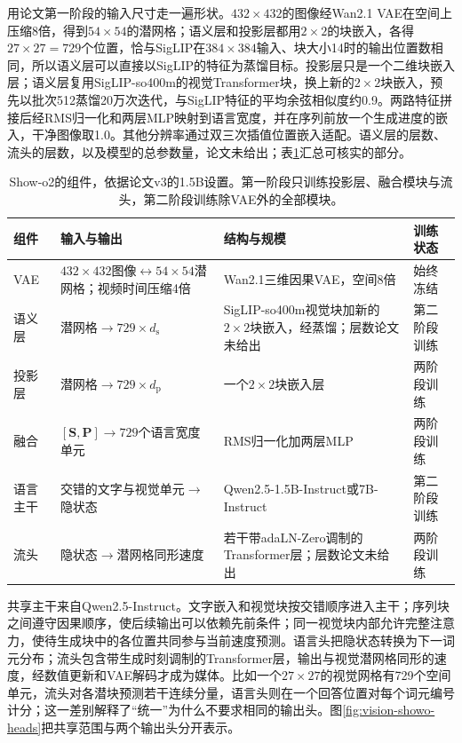 用论文第一阶段的输入尺寸走一遍形状。$432\times432$的图像经Wan2.1 VAE在空间上压缩8倍，得到$54\times54$的潜网格；语义层和投影层都用$2\times2$的块嵌入，各得$27\times27=729$个位置，恰与SigLIP在$384\times384$输入、块大小14时的输出位置数相同，所以语义层可以直接以SigLIP的特征为蒸馏目标。投影层只是一个二维块嵌入层；语义层复用SigLIP-so400m的视觉Transformer块，换上新的$2\times2$块嵌入，预先以批次512蒸馏20万次迭代，与SigLIP特征的平均余弦相似度约0.9。两路特征拼接后经RMS归一化和两层MLP映射到语言宽度，并在序列前放一个生成进度的嵌入，干净图像取1.0。其他分辨率通过双三次插值位置嵌入适配。语义层的层数、流头的层数，以及模型的总参数量，论文未给出；表\ref{tab:vision-models-showo2-config}汇总可核实的部分。

\begin{table}[htbp]
  \centering
  \small
  \begin{tabularx}{\linewidth}{@{}p{14mm}XXp{14mm}@{}}
    \toprule
    组件 & 输入与输出 & 结构与规模 & 训练状态\\
    \midrule
    VAE & $432\times432$图像$\leftrightarrow54\times54$潜网格；视频时间压缩4倍 & Wan2.1三维因果VAE，空间8倍 & 始终冻结\\
    语义层 & 潜网格$\to729\times d_{\mathrm s}$ & SigLIP-so400m视觉块加新的$2\times2$块嵌入，经蒸馏；层数论文未给出 & 第二阶段训练\\
    投影层 & 潜网格$\to729\times d_{\mathrm p}$ & 一个$2\times2$块嵌入层 & 两阶段训练\\
    融合 & $[\bm S,\bm P]\to729$个语言宽度单元 & RMS归一化加两层MLP & 两阶段训练\\
    语言主干 & 交错的文字与视觉单元$\to$隐状态 & Qwen2.5-1.5B-Instruct或7B-Instruct & 第二阶段训练\\
    流头 & 隐状态$\to$潜网格同形速度 & 若干带adaLN-Zero调制的Transformer层；层数论文未给出 & 两阶段训练\\
    \bottomrule
  \end{tabularx}
  \caption{Show-o2的组件，依据论文v3的1.5B设置。第一阶段只训练投影层、融合模块与流头，第二阶段训练除VAE外的全部模块。}
  \label{tab:vision-models-showo2-config}
\end{table}

共享主干来自Qwen2.5-Instruct。文字嵌入和视觉块按交错顺序进入主干；序列块之间遵守因果顺序，使后续输出可以依赖先前条件；同一视觉块内部允许完整注意力，使待生成块中的各位置共同参与当前速度预测。语言头把隐状态转换为下一词元分布；流头包含带生成时刻调制的Transformer层，输出与视觉潜网格同形的速度，经数值更新和VAE解码才成为媒体。比如一个$27\times27$的视觉网格有729个空间单元，流头对各潜块预测若干连续分量，语言头则在一个回答位置对每个词元编号计分；这一差别解释了“统一”为什么不要求相同的输出头。图\ref{fig:vision-showo-heads}把共享范围与两个输出头分开表示。

